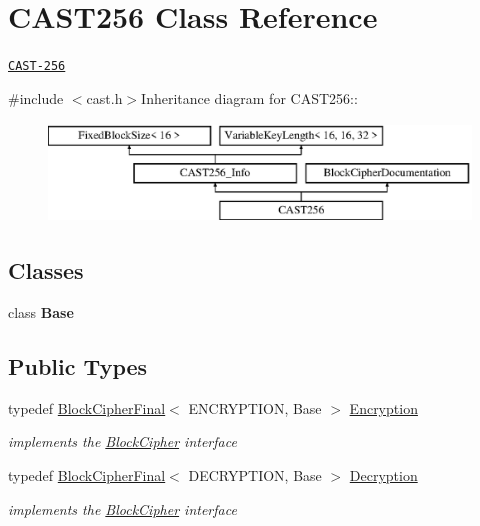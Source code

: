 \hypertarget{class_c_a_s_t256}{
\section{CAST256 Class Reference}
\label{class_c_a_s_t256}
}


\href{http://www.weidai.com/scan-mirror/cs.html#CAST-256}{\tt CAST-\/256}  


{\ttfamily \#include $<$cast.h$>$}Inheritance diagram for CAST256::\begin{figure}[H]
\begin{center}
\leavevmode
\includegraphics[height=2.64151cm]{class_c_a_s_t256}
\end{center}
\end{figure}
\subsection*{Classes}
\begin{DoxyCompactItemize}
\item 
class {\bfseries Base}
\end{DoxyCompactItemize}
\subsection*{Public Types}
\begin{DoxyCompactItemize}
\item 
\hypertarget{class_c_a_s_t256_a0efde2e13cc19f4a704fe72f2d0bb4ad}{
typedef \hyperlink{class_block_cipher_final}{BlockCipherFinal}$<$ ENCRYPTION, Base $>$ \hyperlink{class_c_a_s_t256_a0efde2e13cc19f4a704fe72f2d0bb4ad}{Encryption}}
\label{class_c_a_s_t256_a0efde2e13cc19f4a704fe72f2d0bb4ad}

\begin{DoxyCompactList}\small\item\em implements the \hyperlink{class_block_cipher}{BlockCipher} interface \item\end{DoxyCompactList}\item 
\hypertarget{class_c_a_s_t256_a228efdeef3f2dcaee690e4db576f0364}{
typedef \hyperlink{class_block_cipher_final}{BlockCipherFinal}$<$ DECRYPTION, Base $>$ \hyperlink{class_c_a_s_t256_a228efdeef3f2dcaee690e4db576f0364}{Decryption}}
\label{class_c_a_s_t256_a228efdeef3f2dcaee690e4db576f0364}

\begin{DoxyCompactList}\small\item\em implements the \hyperlink{class_block_cipher}{BlockCipher} interface \item\end{DoxyCompactList}\end{DoxyCompactItemize}


